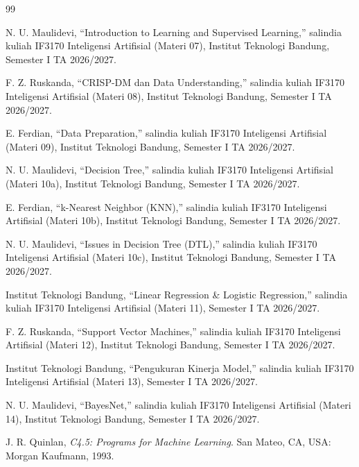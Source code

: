 \clearpage
\renewcommand{\refname}{Referensi}

\begin{thebibliography}{99}

 N. U. Maulidevi, ``Introduction to Learning and
    Supervised Learning,'' salindia kuliah IF3170 Inteligensi Artifisial
    (Materi 07), Institut Teknologi Bandung, Semester I TA 2026/2027.

 F. Z. Ruskanda, ``CRISP-DM dan Data
    Understanding,'' salindia kuliah IF3170 Inteligensi Artifisial
    (Materi 08), Institut Teknologi Bandung, Semester I TA 2026/2027.

 E. Ferdian, ``Data Preparation,'' salindia kuliah
    IF3170 Inteligensi Artifisial (Materi 09), Institut Teknologi Bandung,
    Semester I TA 2026/2027.

 N. U. Maulidevi, ``Decision Tree,'' salindia kuliah
    IF3170 Inteligensi Artifisial (Materi 10a), Institut Teknologi Bandung,
    Semester I TA 2026/2027.

 E. Ferdian, ``k-Nearest Neighbor (KNN),'' salindia
    kuliah IF3170 Inteligensi Artifisial (Materi 10b), Institut Teknologi
    Bandung, Semester I TA 2026/2027.

 N. U. Maulidevi, ``Issues in Decision Tree
    (DTL),'' salindia kuliah IF3170 Inteligensi Artifisial (Materi 10c),
    Institut Teknologi Bandung, Semester I TA 2026/2027.

 Institut Teknologi Bandung, ``Linear Regression \&
    Logistic Regression,'' salindia kuliah IF3170 Inteligensi Artifisial
    (Materi 11), Semester I TA 2026/2027.

 F. Z. Ruskanda, ``Support Vector Machines,''
    salindia kuliah IF3170 Inteligensi Artifisial (Materi 12), Institut
    Teknologi Bandung, Semester I TA 2026/2027.

 Institut Teknologi Bandung, ``Pengukuran Kinerja
    Model,'' salindia kuliah IF3170 Inteligensi Artifisial (Materi 13),
    Semester I TA 2026/2027.

 N. U. Maulidevi, ``BayesNet,'' salindia kuliah IF3170
    Inteligensi Artifisial (Materi 14), Institut Teknologi Bandung, Semester I
    TA 2026/2027.

 J. R. Quinlan, \textit{C4.5: Programs for Machine
    Learning}. San Mateo, CA, USA: Morgan Kaufmann, 1993.


\end{thebibliography}
